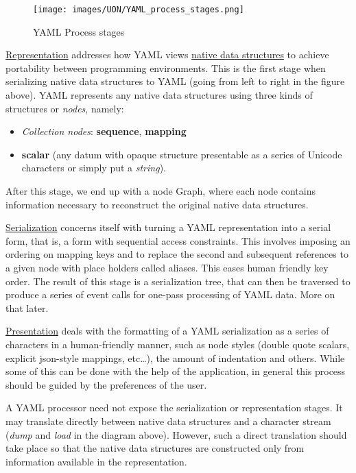 \documentclass[12pt]{article}
\begin{document}
\begin{figure}[ht!]
 	\centering
 	\caption{YAML Process stages}
 	\texttt{[image: images/UON/YAML\_process\_stages.png]}
 	\label{fig:YAML processor}
\end{figure}

\href{https://yaml.org/spec/1.2/spec.html#representation//}{Representation} addresses how YAML views \href{https://yaml.org/spec/1.2/spec.html#native data structure//}{native data structures} to achieve portability between programming environments. This is the first stage when serializing native data structures to YAML (going from left to right in the figure above). YAML represents any native data structures using three kinds of structures or \emph{nodes}, namely:

\begin{itemize}
    \item \emph{Collection nodes}: \textbf{sequence}, \textbf{mapping}
    \item \textbf{scalar}  (any datum with opaque structure presentable as a series of Unicode characters or simply put a \emph{string}).
\end{itemize}

After this stage, we end up with a node Graph, where each node contains information necessary to reconstruct the original native data structures.

\href{https://yaml.org/spec/1.2/spec.html#serialization//}{Serialization} concerns itself with turning a YAML representation into a serial form, that is, a form with sequential access constraints. This involves imposing an ordering on mapping keys and to replace the second and subsequent references to a given node with place holders called aliases. This eases human friendly key order. The result of this stage is a serialization tree, that can then be traversed to produce a series of event calls for one-pass processing of YAML data. More on that later.

\href{https://yaml.org/spec/1.2/spec.html#presentation//}{Presentation} deals with the formatting of a YAML serialization as a series of characters in a human-friendly manner, such as node styles (double quote scalars, explicit json-style mappings, etc…), the amount of indentation and others. While some of this can be done with the help of the application, in general this process should be guided by the preferences of the user.

A YAML processor need not expose the serialization or representation stages. It may translate directly between native data structures and a character stream (\emph{dump} and \emph{load} in the diagram above). However, such a direct translation should take place so that the native data structures are constructed only from information available in the representation.
\end{document}

